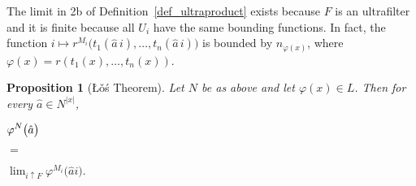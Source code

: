 \documentclass[12pt,letterpaper,oneside,reqno]{amsart}
\theoremstyle{plain}
\newtheorem{proposition}[theorem]{Proposition}
\theoremstyle{remark}
\begin{document}
The limit in 2b of Definition~\ref{def_ultraproduct} exists because $F$ is an ultrafilter and it is finite because all $U_i$ have the same bounding functions.
In fact, the function $i\mapsto r^{M_i}\big(t_1(\hat a\,i),\dots,t_n(\hat a\,i)\big)$ is bounded by $n_{\varphi(x)}$, where $\varphi(x)=r(t_1(x),\dots,t_n(x))$.

\def\ceq#1#2#3{\parbox[t]{43ex}{$\displaystyle #1$}\parbox{5ex}{\hfil $#2$}{$\displaystyle #3$}}

\begin{proposition}[\L\v{o}\'s Theorem]
Let $N$ be as above and let $\varphi(x)\in L$. Then for every $\hat a\in N^{|x|}$, 

\ceq{\hfill \varphi^N\big(\hat a\big)}{=}{\lim_{i\uparrow F}\varphi^{M_i}\big(\hat ai\big).}

\end{proposition}
\end{document}
